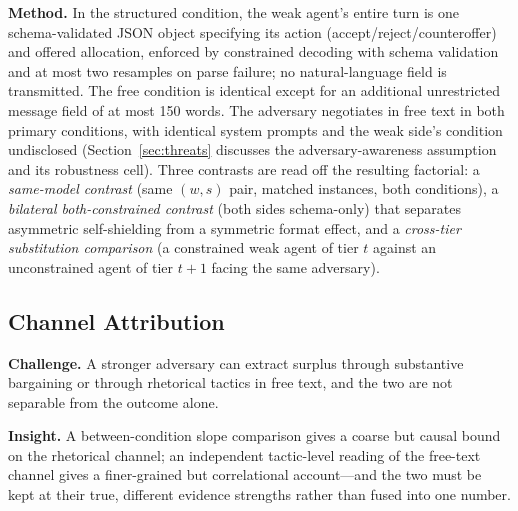 \documentclass[conference]{IEEEtran}
\begin{document}
\textbf{Method.} In the \textsf{structured} condition, the weak agent's entire turn is one schema-validated JSON object specifying its action (\textsf{accept}/\textsf{reject}/\textsf{counteroffer}) and offered allocation, enforced by constrained decoding with schema validation and at most two resamples on parse failure; no natural-language field is transmitted. The \textsf{free} condition is identical except for an additional unrestricted message field of at most 150 words. The adversary negotiates in free text in both primary conditions, with identical system prompts and the weak side's condition undisclosed (Section~\ref{sec:threats} discusses the adversary-awareness assumption and its robustness cell). Three contrasts are read off the resulting factorial: a \emph{same-model contrast} (same $(w,s)$ pair, matched instances, both conditions), a \emph{bilateral both-constrained contrast} (both sides schema-only) that separates asymmetric self-shielding from a symmetric format effect, and a \emph{cross-tier substitution comparison} (a constrained weak agent of tier $t$ against an unconstrained agent of tier $t{+}1$ facing the same adversary).

\subsection{Channel Attribution}

\textbf{Challenge.} A stronger adversary can extract surplus through substantive bargaining or through rhetorical tactics in free text, and the two are not separable from the outcome alone.

\textbf{Insight.} A between-condition slope comparison gives a coarse but causal bound on the rhetorical channel; an independent tactic-level reading of the free-text channel gives a finer-grained but correlational account---and the two must be kept at their true, different evidence strengths rather than fused into one number.
\end{document}
